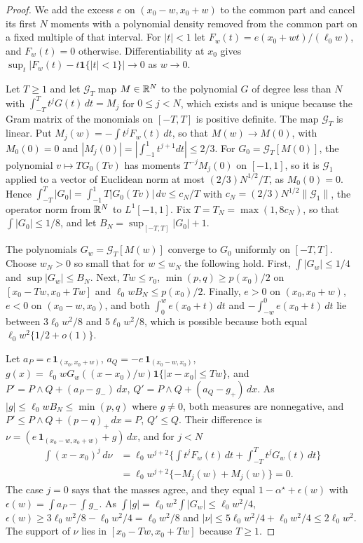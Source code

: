 \begin{proof}
We add the excess $e$ on $(x_0-w,x_0+w)$ to the common part and cancel its first $N$ moments with a polynomial density
removed from the common part on a fixed multiple of that interval. For $|t|<1$ let $F_w(t)=e(x_0+wt)/(\ell_0w)$, and
$F_w(t)=0$ otherwise. Differentiability at $x_0$ gives $\sup_t|F_w(t)-t\mathbf 1\{|t|<1\}|\to0$ as $w\to0$.

Let $T\ge1$ and let $\mathcal G_T$ map $M\in\mathbb{R}^N$ to the polynomial $G$ of degree less than $N$ with
$\int_{-T}^Tt^jG(t)\,dt=M_j$ for $0\le j<N$, which exists and is unique because the Gram matrix of the monomials on
$[-T,T]$ is positive definite. The map $\mathcal G_T$ is linear. Put $M_j(w)=-\int t^jF_w(t)\,dt$, so that $M(w)\to M(0)$,
with $M_0(0)=0$ and $|M_j(0)|=|\int_{-1}^1t^{j+1}dt|\le2/3$. For $G_0=\mathcal G_T[M(0)]$, the polynomial $v\mapsto TG_0(Tv)$ has
moments $T^{-j}M_j(0)$ on $[-1,1]$, so it is $\mathcal G_1$ applied to a vector of Euclidean norm at most
$(2/3)N^{1/2}/T$, as $M_0(0)=0$. Hence $\int_{-T}^T|G_0|=\int_{-1}^1T|G_0(Tv)|\,dv\le c_N/T$ with
$c_N=(2/3)N^{1/2}\|\mathcal G_1\|$, the operator norm from $\mathbb{R}^N$ to $L^1[-1,1]$. Fix $T=T_N=\max(1,8c_N)$, so that
$\int|G_0|\le1/8$, and let $B_N=\sup_{[-T,T]}|G_0|+1$.

The polynomials $G_w=\mathcal G_T[M(w)]$ converge to $G_0$ uniformly on $[-T,T]$. Choose $w_N>0$ so small that for $w\le w_N$ the following hold. First, $\int|G_w|\le1/4$
and $\sup|G_w|\le B_N$. Next, $Tw\le r_0$, $\min(p,q)\ge p(x_0)/2$ on $[x_0-Tw,x_0+Tw]$ and $\ell_0wB_N\le p(x_0)/2$. Finally,
$e>0$ on $(x_0,x_0+w)$, $e<0$ on $(x_0-w,x_0)$, and both $\int_0^we(x_0+t)\,dt$ and $-\int_{-w}^0e(x_0+t)\,dt$ lie between
$3\ell_0w^2/8$ and $5\ell_0w^2/8$, which is possible because both equal $\ell_0w^2\{1/2+o(1)\}$.

Let $a_P=e\,\mathbf 1_{(x_0,x_0+w)}$, $a_Q=-e\,\mathbf 1_{(x_0-w,x_0)}$, $g(x)=\ell_0wG_w((x-x_0)/w)\mathbf 1\{|x-x_0|\le Tw\}$, and
$P'=P\wedge Q+(a_P-g_-)\,dx$, $Q'=P\wedge Q+(a_Q-g_+)\,dx$. As $|g|\le\ell_0wB_N\le\min(p,q)$ where $g\neq0$, both measures are nonnegative,
and $P'\le P\wedge Q+(p-q)_+\,dx=P$, $Q'\le Q$. Their difference is $\nu=(e\,\mathbf 1_{(x_0-w,x_0+w)}+g)\,dx$, and for $j<N$
\begin{align*}
\int(x-x_0)^j\,d\nu&=\ell_0w^{j+2}\Big\{\int t^jF_w(t)\,dt+\int_{-T}^Tt^jG_w(t)\,dt\Big\}\\
&=\ell_0w^{j+2}\{-M_j(w)+M_j(w)\}=0 .
\end{align*}
The case $j=0$ says that the masses agree, and they equal $1-\alpha^\star+\epsilon(w)$ with $\epsilon(w)=\int a_P-\int g_-$. As
$\int|g|=\ell_0w^2\int|G_w|\le\ell_0w^2/4$, $\epsilon(w)\ge3\ell_0w^2/8-\ell_0w^2/4=\ell_0w^2/8$ and
$|\nu|\le5\ell_0w^2/4+\ell_0w^2/4\le2\ell_0w^2$. The support of $\nu$ lies in $[x_0-Tw,x_0+Tw]$ because $T\ge1$.


\end{proof}
